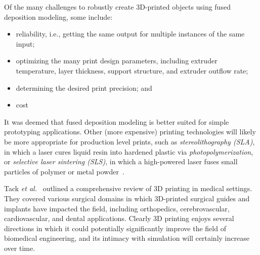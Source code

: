 Of the many challenges to robustly create 3D-printed objects using fused deposition modeling, some include:
\begin{itemize}[noitemsep]
\item reliability, i.e., getting the same output for multiple instances of the same input;
\item optimizing the many print design parameters, including extruder temperature, layer thickness, support structure, and extruder outflow rate;
\item determining the desired print precision; and
\item cost
\end{itemize}
It was deemed that fused deposition modeling is better suited for simple prototyping applications. Other (more expensive) printing technologies will likely be more appropriate for production level prints, such as \textit{stereolithography (SLA)}, in which a laser cures liquid resin into hardened plastic via \textit{photopolymerization}, or \textit{selective laser sintering (SLS)}, in which a high-powered laser fuses small particles of polymer or metal powder~\cite{3dprints}.

Tack \textit{et al.}~\cite{tack_2016} outlined a comprehensive review of 3D printing in medical settings. They covered various surgical domains in which 3D-printed surgical guides and implants have impacted the field, including orthopedics, cerebrovascular, cardiovascular, and dental applications. Clearly 3D printing enjoys several directions in which it could potentially significantly improve the field of biomedical engineering, and its intimacy with simulation will certainly increase over time.
